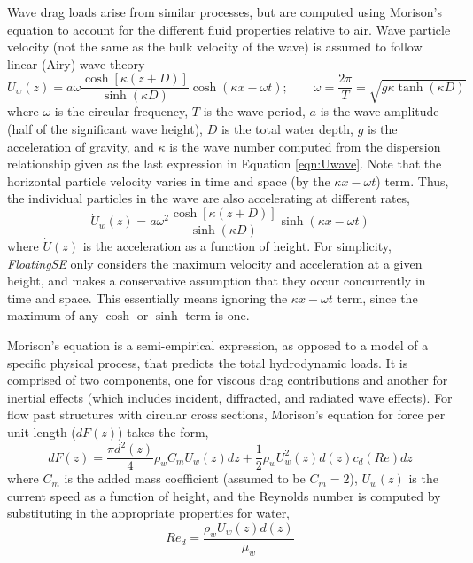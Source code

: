 Wave drag loads arise from similar processes, but are computed using
Morison's equation to account for the different fluid properties
relative to air.  Wave particle velocity (not the same as the bulk
velocity of the wave) is assumed to follow linear (Airy) wave theory
\begin{equation} \label{eqn:Uwave}
U_w(z) = a\omega\frac{\cosh\left[\kappa\left(z + D \right)\right]}{\sinh\left(\kappa D\right)}\cosh\left(\kappa x -
  \omega t\right);
\qquad \omega=\frac{2\pi}{T} = \sqrt{ g \kappa \tanh\left(\kappa D\right) }
\end{equation}
where $\omega$ is the circular frequency, $T$ is the wave period, $a$ is
the wave amplitude (half of the significant wave height), $D$ is the total water depth, $g$ is the
acceleration of gravity, and $\kappa$ is the
wave number computed from the dispersion relationship given as the last
expression in Equation \ref{eqn:Uwave}.  Note that the horizontal
particle velocity varies in time and space (by the $\kappa x - \omega
t$) term.  Thus, the individual particles in the wave are also
accelerating at different rates,
\begin{equation} \label{eqn:Awave}
\dot{U}_w(z) = a\omega^2\frac{\cosh\left[\kappa\left(z + D \right)\right]}{\sinh\left(\kappa D\right)}\sinh\left(\kappa x -
  \omega t\right)
\end{equation}
where $\dot{U}(z)$ is the acceleration as a function of height.  For
simplicity, \textit{FloatingSE} only considers the maximum velocity and
acceleration at a given height, and makes a conservative assumption that
they occur concurrently in time and space.  This essentially means ignoring the
$\kappa x - \omega t$ term, since the maximum of any $\cosh$ or $\sinh$
term is one.

Morison's equation is a semi-empirical expression, as opposed to a model
of a specific physical process, that predicts the total hydrodynamic
loads.  It is comprised of two components, one for viscous drag
contributions and another for inertial effects (which includes incident,
diffracted, and radiated wave effects).  For flow past structures with
circular cross sections, Morison's equation for force per unit length
($dF(z)$) takes the form,
\begin{equation} \label{eqn:morison}
  dF(z) = \frac{\pi d^2(z)}{4} \rho_w C_m \dot{U}_w(z)dz + \frac{1}{2} \rho_w U_w^2(z) d(z) c_d(Re)dz
\end{equation}
where $C_m$ is the added mass coefficient (assumed to be $C_m=2$),
$U_w(z)$ is the current speed as a function of height, and the Reynolds
number is computed by substituting in the appropriate properties for
water,
\[
Re_d = \frac{\rho_w U_w(z) d(z)}{\mu_w}
\]



